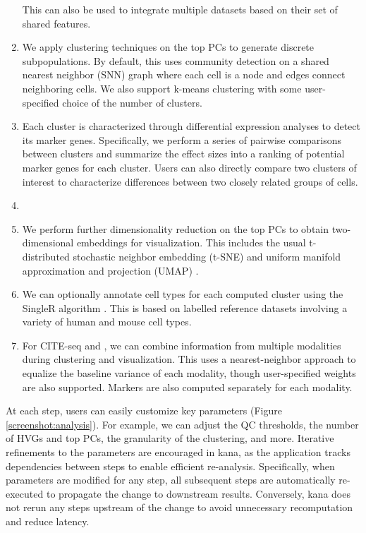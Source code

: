 \documentclass{article}
\begin{document}
\begin{enumerate}
This can also be used to integrate multiple datasets based on their set of shared features.
\item We apply clustering techniques on the top PCs to generate discrete subpopulations.
By default, this uses  community detection on a shared nearest neighbor (SNN) graph where each cell is a node and edges connect neighboring cells.
We also support k-means clustering with some user-specified choice of the number of clusters.
\item Each cluster is characterized through differential expression analyses to detect its marker genes.
Specifically, we perform a series of pairwise comparisons between clusters and summarize the effect sizes into a ranking of potential marker genes for each cluster.
Users can also directly compare two clusters of interest to characterize differences between two closely related groups of cells.
\item {}
\item We perform further dimensionality reduction on the top PCs to obtain two-dimensional embeddings for visualization. 
This includes the usual t-distributed stochastic neighbor embedding (t-SNE) and uniform manifold approximation and projection (UMAP) \cite{maaten2014accelerating,mcinnes2018umap}.
\item We can optionally annotate cell types for each computed cluster using the SingleR algorithm \cite{aran2019reference}.
This is based on labelled reference datasets involving a variety of human and mouse cell types.
\item For CITE-seq \cite{stoeckius2017simultaneous} and , we can combine information from multiple modalities during clustering and visualization.
This uses a nearest-neighbor approach to equalize the baseline variance of each modality, though user-specified weights are also supported. 
Markers are also computed separately for each modality.
\end{enumerate}

At each step, users can easily customize key parameters (Figure \ref{screenshot:analysis}).
For example, we can adjust the QC thresholds, the number of HVGs and top PCs, the granularity of the clustering, and more. 
Iterative refinements to the parameters are encouraged in kana, as the application tracks dependencies between steps to enable efficient re-analysis.
Specifically, when parameters are modified for any step, all subsequent steps are automatically re-executed to propagate the change to downstream results.
Conversely, kana does not rerun any steps upstream of the change to avoid unnecessary recomputation and reduce latency.
\end{document}
